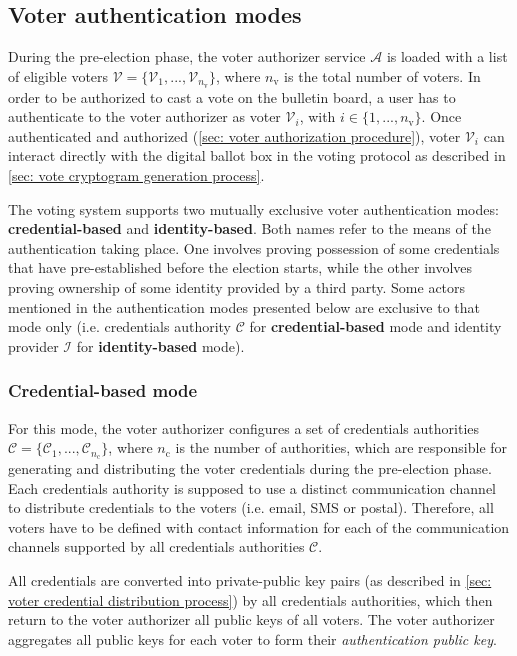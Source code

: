 \subsection{Voter authentication modes} \label{sec: voter authentication modes}
During the pre-election phase, the voter authorizer service $\mathcal{A}$ is loaded with a list of eligible voters $\boldsymbol{\mathcal{V}} = \{ \mathcal{V}_1, ..., \mathcal{V}_{n_\mathrm{v}} \}$, where $n_\mathrm{v}$ is the total number of voters. In order to be authorized to cast a vote on the bulletin board, a user has to authenticate to the voter authorizer as voter $\mathcal{V}_i$, with $i \in \{ 1, ..., n_\mathrm{v} \}$. Once authenticated and authorized (\cref{sec: voter authorization procedure}), voter $\mathcal{V}_i$ can interact directly with the digital ballot box in the voting protocol as described in \cref{sec: vote cryptogram generation process}.

The voting system supports two mutually exclusive voter authentication modes: \textbf{credential-based} and \textbf{identity-based}. Both names refer to the means of the authentication taking place. One involves proving possession of some credentials that have pre-established before the election starts, while the other involves proving ownership of some identity provided by a third party. Some actors mentioned in the authentication modes presented below are exclusive to that mode only (i.e. credentials authority $\mathcal{C}$ for \textbf{credential-based} mode and identity provider $\mathcal{I}$ for \textbf{identity-based} mode).


\subsubsection{Credential-based mode} \label{sec: credential-based mode}
For this mode, the voter authorizer configures a set of credentials authorities $\boldsymbol{\mathcal{C}} = \{\mathcal{C}_1, ..., \mathcal{C}_{n_\mathrm{c}}\}$, where $n_\mathrm{c}$ is the number of authorities, which are responsible for generating and distributing the voter credentials during the pre-election phase. Each credentials authority is supposed to use a distinct communication channel to distribute credentials to the voters (i.e. email, SMS or postal). Therefore, all voters have to be defined with contact information for each of the communication channels supported by all credentials authorities $\boldsymbol{\mathcal{C}}$.

All credentials are converted into private-public key pairs (as described in \cref{sec: voter credential distribution process}) by all credentials authorities, which then return to the voter authorizer all public keys of all voters. The voter authorizer aggregates all public keys for each voter to form their \textit{authentication public key}. 

